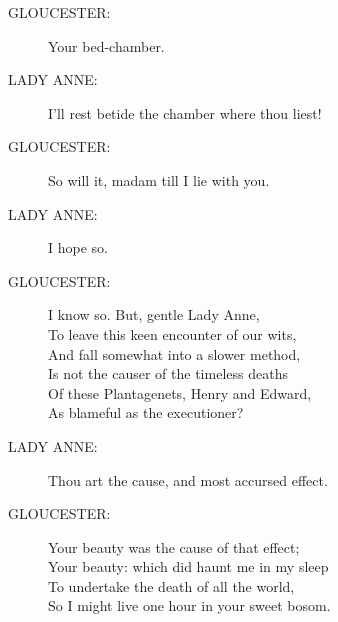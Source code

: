 \documentclass{article}
\begin{document}
\begin{description}
\item[GLOUCESTER:] 
\hspace{1pt}Your bed-chamber.\\
\end{description}
\begin{description}
\item[LADY ANNE:] 
\hspace{1pt}I'll rest betide the chamber where thou liest!\\
\end{description}
\begin{description}
\item[GLOUCESTER:] 
\hspace{1pt}So will it, madam till I lie with you.\\
\end{description}
\begin{description}
\item[LADY ANNE:] 
\hspace{1pt}I hope so.\\
\end{description}
\begin{description}
\item[GLOUCESTER:] 
\hspace{1pt}I know so. But, gentle Lady Anne,\\
\hspace{1pt}To leave this keen encounter of our wits,\\
\hspace{1pt}And fall somewhat into a slower method,\\
\hspace{1pt}Is not the causer of the timeless deaths\\
\hspace{1pt}Of these Plantagenets, Henry and Edward,\\
\hspace{1pt}As blameful as the executioner?\\
\end{description}
\begin{description}
\item[LADY ANNE:] 
\hspace{1pt}Thou art the cause, and most accursed effect.\\
\end{description}
\begin{description}
\item[GLOUCESTER:] 
\hspace{1pt}Your beauty was the cause of that effect;\\
\hspace{1pt}Your beauty: which did haunt me in my sleep\\
\hspace{1pt}To undertake the death of all the world,\\
\hspace{1pt}So I might live one hour in your sweet bosom.\\
\end{description}
\end{document}
